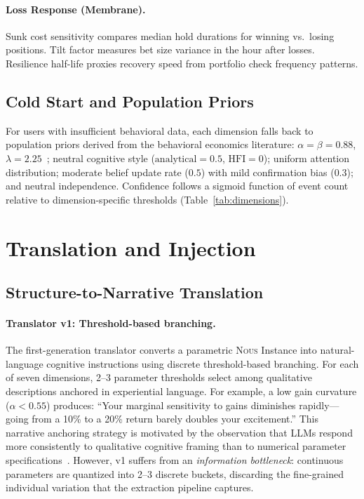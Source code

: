 \documentclass[11pt]{article}
\newcommand{\nous}{\textsc{Nous}}
\begin{document}
\paragraph{Loss Response (Membrane).}
Sunk cost sensitivity compares median hold durations for winning vs.\ losing positions. Tilt factor measures bet size variance in the hour after losses. Resilience half-life proxies recovery speed from portfolio check frequency patterns.

\subsection{Cold Start and Population Priors}

For users with insufficient behavioral data, each dimension falls back to population priors derived from the behavioral economics literature: $\alpha = \beta = 0.88$, $\lambda = 2.25$~\citep{kahneman1979prospect}; neutral cognitive style ($\text{analytical} = 0.5$, $\text{HFI} = 0$); uniform attention distribution; moderate belief update rate ($0.5$) with mild confirmation bias ($0.3$); and neutral independence. Confidence follows a sigmoid function of event count relative to dimension-specific thresholds (Table~\ref{tab:dimensions}).


\section{Translation and Injection}
\label{sec:injection}

\subsection{Structure-to-Narrative Translation}

\paragraph{Translator v1: Threshold-based branching.}
The first-generation translator converts a parametric \nous{} Instance into natural-language cognitive instructions using discrete threshold-based branching. For each of seven dimensions, 2--3 parameter thresholds select among qualitative descriptions anchored in experiential language. For example, a low gain curvature ($\alpha < 0.55$) produces: ``Your marginal sensitivity to gains diminishes rapidly---going from a 10\% to a 20\% return barely doubles your excitement.'' This narrative anchoring strategy is motivated by the observation that LLMs respond more consistently to qualitative cognitive framing than to numerical parameter specifications~\citep{wei2022chain}. However, v1 suffers from an \emph{information bottleneck}: continuous parameters are quantized into 2--3 discrete buckets, discarding the fine-grained individual variation that the extraction pipeline captures.
\end{document}
